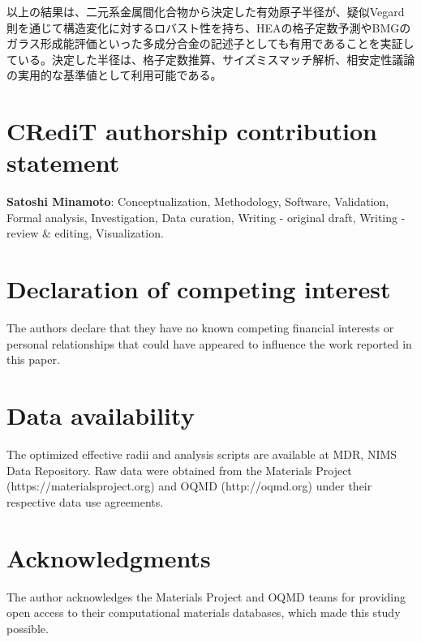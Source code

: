 \documentclass[a4paper,10pt,5p]{elsarticle}
\begin{document}
以上の結果は、二元系金属間化合物から決定した有効原子半径が、疑似Vegard則を通じて構造変化に対するロバスト性を持ち、HEAの格子定数予測やBMGのガラス形成能評価といった多成分合金の記述子としても有用であることを実証している。決定した半径は、格子定数推算、サイズミスマッチ解析、相安定性議論の実用的な基準値として利用可能である。


\section*{CRediT authorship contribution statement}

\textbf{Satoshi Minamoto}: Conceptualization, Methodology, Software, Validation, Formal analysis, Investigation, Data curation, Writing - original draft, Writing - review \& editing, Visualization.


\section*{Declaration of competing interest}

The authors declare that they have no known competing financial interests or personal relationships that could have appeared to influence the work reported in this paper.

\section*{Data availability}

The optimized effective radii and analysis scripts are available at MDR, NIMS Data Repository. Raw data were obtained from the Materials Project (https://materialsproject.org) and OQMD (http://oqmd.org) under their respective data use agreements.


\section*{Acknowledgments}

The author acknowledges the Materials Project and OQMD teams for providing open access to their computational materials databases, which made this study possible. 





\end{document}

